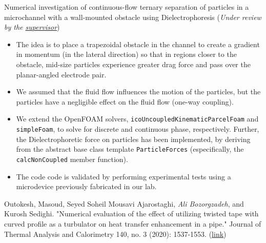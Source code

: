 %
%
%


\begin{scholarship}
  {
    Numerical investigation of continuous-flow ternary separation of particles
    in a microchannel with a wall-mounted obstacle using Dielectrophoresis
    (\emph{Under review by the \href{supervisor}{supervisor}})
 \vspace{10pt}
  \begin{itemize}

    \item The idea is to place a trapezoidal obstacle in the channel to create
        a gradient in momentum (in the lateral direction) so that in regions
        closer to the obstacle, mid-size particles experience greater drag force
        and pass over the planar-angled electrode pair.\vspace{10pt}

    \item We assumed that the fluid flow influences the motion of the particles, but
          the particles have a negligible effect on the fluid flow (one-way
          coupling).\vspace{10pt}

    \item We extend the OpenFOAM solvers,
          \texttt{icoUncoupledKinematicParcelFoam} and \texttt{simpleFoam}, to
          solve for discrete and continuous phase, respectively. Further,
          the Dielectrophoretic force on particles has been implemented, by
          deriving from the abstract base class template \texttt{ParticleForces}
          (especifically, the \texttt{calcNonCoupled} member function).
  \vspace{10pt}
    \item The code code is validated by performing experimental tests using
      a microdevice previously fabricated in our lab.

  \end{itemize}
}

{
  Outokesh, Masoud, Seyed Soheil Mousavi Ajarostaghi, \emph{Ali Bozorgzadeh}, and Kurosh Sedighi. "Numerical evaluation of the effect of utilizing twisted tape with curved profile as a turbulator on heat transfer enhancement in a pipe." Journal of Thermal Analysis and Calorimetry 140, no. 3 (2020): 1537-1553. (\href{https://link.springer.com/article/10.1007/s10973-020-09336-0}{link})
  }

\end{scholarship}
